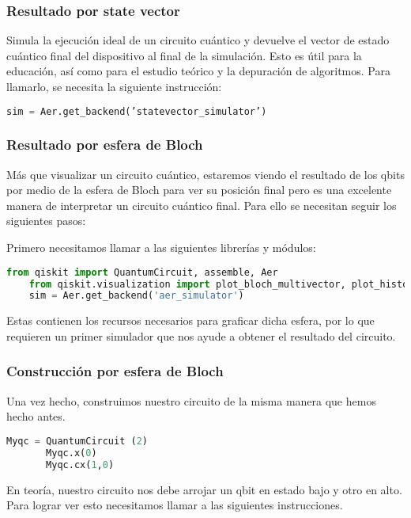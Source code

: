 \documentclass[spanish]{beamer}
\begin{document}
    \begin{frame}[fragile]
   \frametitle{Resultado por state vector}
   Simula la ejecución ideal de un circuito cuántico y devuelve el vector de estado cuántico final del dispositivo al final de la simulación. Esto es útil para la educación, así como para el estudio teórico y la depuración de algoritmos.
   Para llamarlo, se necesita la siguiente instrucción:
   \begin{lstlisting}[language=Python]
    sim = Aer.get_backend(’statevector_simulator’) \end{lstlisting} 
   \end{frame}
   \begin{frame}[fragile]
   \frametitle{Resultado por esfera de Bloch}  
   Más que visualizar un circuito cuántico, estaremos viendo el resultado de los qbits por medio de la esfera de Bloch para ver su posición final pero es una excelente manera de interpretar un circuito cuántico final.
    Para ello se necesitan seguir los siguientes pasos:
    
    Primero necesitamos llamar a las siguientes librerías y módulos:

    
     \begin{lstlisting}[language=Python]
    from qiskit import QuantumCircuit, assemble, Aer
    from qiskit.visualization import plot_bloch_multivector, plot_histogram
    sim = Aer.get_backend('aer_simulator') \end{lstlisting} 
        
     Estas contienen los recursos necesarios para graficar dicha esfera, por lo que requieren un primer simulador que nos ayude a obtener el resultado del circuito.
     
     \end{frame}
     
    \newpage\begin{frame}[fragile]
    \frametitle{Construcción por esfera de Bloch} 
    Una vez hecho, construimos nuestro circuito de la misma manera que hemos hecho antes.
    \begin{lstlisting}[language=Python]
       Myqc = QuantumCircuit (2)
       Myqc.x(0)
       Myqc.cx(1,0)\end{lstlisting}
     
     En teoría, nuestro circuito nos debe arrojar un qbit en estado bajo y otro en alto. Para lograr ver esto necesitamos llamar a las siguientes instrucciones.
    \end{frame}
    
\end{document}
